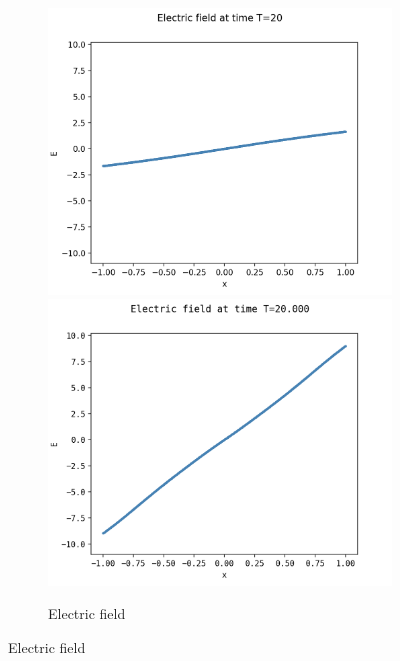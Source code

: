 \documentclass{article}
\numberwithin{equation}{section}
\newcommand{\imh}{\textheight} %
\newcommand{\imw}{\textwidth} %
\begin{document}
\begin{figure}
	\centering
	\newcommand{\rootSL}{../code_SL/}
	\newcommand{\rootFD}{../temp_res_DF/}
	\newcommand{\dirSL}{run_comp_short_time_2sp_Nx1000_Nvi2001_Nve2001_Nt6250}
	\newcommand{\dirFD}{run_comp_short_time_2sp_Nx1000_Nv2000_Nt6250}
	
	\renewcommand{\imh}{0.24\textheight}
	\renewcommand{\imw}{0.45\linewidth}
	
	\begin{subfigure}{\textwidth}
		\centering
		\includegraphics[height=\imh,width=\imw]{images/ET20_FD.png}
		\includegraphics[height=\imh,width=\imw]{images/ET20_512.png}
		\caption{Electric field }
		\label{subfig:compT02_E}
	\end{subfigure}


\end{figure}
\end{document}
